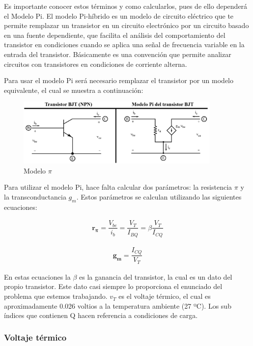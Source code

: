 Es importante conocer estos términos y como calcularlos, pues de ello dependerá el Modelo Pi. El modelo Pi-híbrido es un modelo de circuito eléctrico que te permite remplazar un transistor en un circuito electrónico por un circuito basado en una fuente dependiente, que facilita el análisis del comportamiento del transistor en condiciones cuando se aplica una señal de frecuencia variable en la entrada del transistor. Básicamente es una convención que permite analizar circuitos con transistores en condiciones de corriente alterna.

Para usar el modelo Pi será necesario remplazar el transistor por un modelo equivalente, el cual se muestra a continuación:

\begin{figure}[H]
    \centering
    \includegraphics[width=10cm]{Imagenes/modelopi.jpg}
    \caption{Modelo $\pi$}
    \label{fig:modelo_pi}
\end{figure}

Para utilizar el modelo Pi, hace falta calcular dos parámetros: la resistencia $\pi$ y la transconductancia \textbf{$g_m$}. Estos parámetros se calculan utilizando las siguientes ecuaciones:

\begin{gather}
    \mathbf{r_{\pi}} = \dfrac{V_{be}}{i_b} = \dfrac{V_T}{I_{BQ}} = \beta \dfrac{V_T}{I_{CQ}} \label{eqn:rpi}
\end{gather}

\begin{gather}
    \mathbf{g_m}= \dfrac{I_{CQ}}{V_T} \label{eqn:gm}
\end{gather}

En estas ecuaciones la $\beta$ es la ganancia del transistor, la cual es un dato del propio transistor. Este dato casi siempre lo proporciona el enunciado del problema que estemos trabajando. $v_T$ es el voltaje térmico, el cual es aproximadamente 0.026 voltios a la temperatura ambiente (27 ºC). Los sub índices que contienen Q hacen referencia a condiciones de carga.

\subsubsection{Voltaje térmico}

